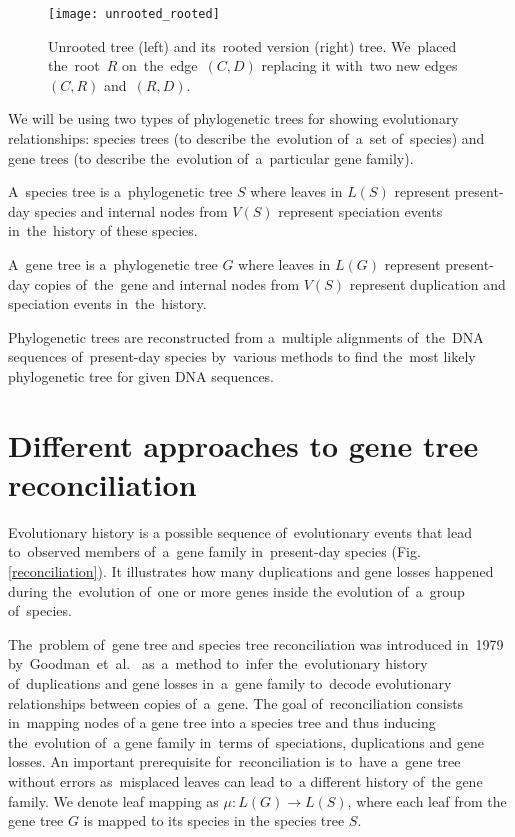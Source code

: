 \begin{figure}[ht!]
	\centering
	\label{unrooted_rooted}
  	\texttt{[image: unrooted\_rooted]}
  	\caption[Unrooted tree and its~rooted version]{Unrooted tree (left) and its~rooted version (right) tree. We~placed the~root~$R$ on~the~edge~$(C, D)$ replacing it with~two new edges~$(C, R)$ and~$(R, D)$.}
\end{figure}

We will be using two types of phylogenetic trees for showing evolutionary relationships: species trees (to describe the~evolution of~a~set of~species) and gene trees (to describe the~evolution of~a~particular gene family).

A~species tree is a~phylogenetic tree $S$ where leaves in $L(S)$ represent present-day species and internal nodes from $V(S)$ represent speciation events in~the~history of these species.

A~gene tree is a~phylogenetic tree $G$ where leaves in $L(G)$ represent present-day copies of~the~gene and internal nodes from $V(S)$ represent duplication and speciation events in~the~history.

Phylogenetic trees are reconstructed from a~multiple alignments of~the~DNA sequences of~present-day species by~various methods \cite{felsenstein} to find the~most likely phylogenetic tree for given DNA sequences.

\section{Different approaches to gene tree reconciliation} \label{different_approaches}
Evolutionary history is a possible sequence of~evolutionary events that lead to~observed members of~a~gene family in~present-day species (Fig. \ref{reconciliation}). It illustrates how many duplications and gene losses happened during the~evolution of~one or more genes inside the evolution of~a~group of~species.

The~problem of~gene tree and species tree reconciliation was introduced in~1979 by~Goodman~et~al.~\cite{goodman} as~a~method to~infer the~evolutionary history of~duplications and gene losses in~a~gene family to~decode evolutionary relationships between copies of~a~gene. The goal of~reconciliation consists in~mapping nodes of a gene tree into a species tree and thus inducing the~evolution of~a gene family in~terms of~speciations, duplications and gene losses. An important prerequisite for~reconciliation is to~have a~gene tree without errors as~misplaced leaves can lead to~a different history of~the gene family.
We denote leaf mapping as $\mu: L(G) \rightarrow L(S)$, where each leaf from the gene tree $G$ is mapped to its species in the species tree $S$.

